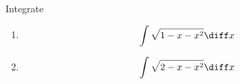 Integrate
\begin{enumerate}
\item 
\[
\int \sqrt{1-x-x^2}\diff x
\]
\item 
\[
\int \sqrt{2-x-x^2}\diff x
\]
\end{enumerate}